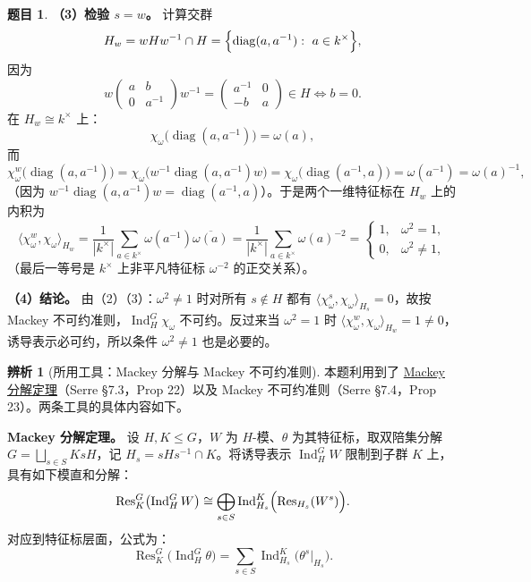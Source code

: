\documentclass[a4paper]{ctexart}
\theoremstyle{definition}
\newtheorem{example}{题目}[section]
\theoremstyle{analysis}
\newtheorem{remark}{辨析}[section]
\theoremstyle{plain}
\begin{document}
\begin{example}
\textbf{（3）检验 \(s=w\)。} 计算交群
\[
  H_w=wHw^{-1}\cap H=\Bigl\{\operatorname{diag}(a,a^{-1}):\ a\in k^\times\Bigr\},
\]
因为
\[
  w\begin{pmatrix} a & b \\ 0 & a^{-1}\end{pmatrix}w^{-1}
  =
  \begin{pmatrix} a^{-1} & 0 \\ -b & a \end{pmatrix}
  \in H
  \iff b=0.
\]
在 \(H_w\cong k^\times\) 上：
\[
  \chi_\omega\bigl(\operatorname{diag}(a,a^{-1})\bigr)=\omega(a),
\]
而
\[
  \chi_\omega^w\bigl(\operatorname{diag}(a,a^{-1})\bigr)
  =\chi_\omega\bigl(w^{-1}\operatorname{diag}(a,a^{-1})w\bigr)
  =\chi_\omega\bigl(\operatorname{diag}(a^{-1},a)\bigr)
  =\omega(a^{-1})=\omega(a)^{-1},
\]
（因为 \(w^{-1}\operatorname{diag}(a,a^{-1})w=\operatorname{diag}(a^{-1},a)\)）。于是两个一维特征标在 \(H_w\) 上的内积为
\[
  \langle\chi_\omega^w,\chi_\omega\rangle_{H_w}
  =
  \frac{1}{|k^\times|}\sum_{a\in k^\times}\omega(a^{-1})\overline{\omega(a)}
  =
  \frac{1}{|k^\times|}\sum_{a\in k^\times}\omega(a)^{-2}
  =
  \begin{cases}
    1, & \omega^2=1,\\
    0, & \omega^2\neq 1,
  \end{cases}
\]
（最后一等号是 \(k^\times\) 上非平凡特征标 \(\omega^{-2}\) 的正交关系）。

\textbf{（4）结论。} 由（2）（3）：\(\omega^2\neq 1\) 时对所有 \(s\notin H\) 都有 \(\langle\chi_\omega^s,\chi_\omega\rangle_{H_s}=0\)，故按 Mackey 不可约准则，\(\operatorname{Ind}_H^G\chi_\omega\) 不可约。反过来当 \(\omega^2=1\) 时 \(\langle\chi_\omega^w,\chi_\omega\rangle_{H_w}=1\neq 0\)，诱导表示必可约，所以条件 \(\omega^2\neq 1\) 也是必要的。

\begin{remark}[所用工具：Mackey 分解与 Mackey 不可约准则]
本题利用到了 \hyperref[subsec:mackey-decomposition]{Mackey 分解定理}（Serre \S7.3，Prop 22）以及 Mackey 不可约准则（Serre \S7.4，Prop 23）。两条工具的具体内容如下。

\textbf{Mackey 分解定理。} 设 \(H,K\le G\)，\(W\) 为 \(H\)-模、\(\theta\) 为其特征标，取双陪集分解 \(G=\bigsqcup_{s\in S}KsH\)，记 \(H_s=sHs^{-1}\cap K\)。将诱导表示 \(\operatorname{Ind}_H^G W\) 限制到子群 \(K\) 上，具有如下模直和分解：
\[
  \operatorname{Res}_K^G\bigl(\operatorname{Ind}_H^G W\bigr)
  \cong
  \bigoplus_{s\in S}\operatorname{Ind}_{H_s}^K\Bigl(\operatorname{Res}_{H_s}(W^s)\Bigr).
\]
对应到特征标层面，公式为：
\[
  \operatorname{Res}_K^G\bigl(\operatorname{Ind}_H^G\theta\bigr)
  =
  \sum_{s\in S}\operatorname{Ind}_{H_s}^K\bigl(\theta^s\big|_{H_s}\bigr).
\]


\end{remark}
\end{example}
\end{document}
